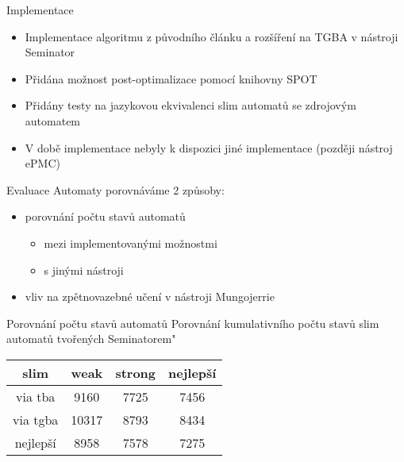 \documentclass[
]{beamer}
\begin{document}
	\begin{frame}{Implementace}
		\begin{itemize}
			\pause
			\item Implementace algoritmu z původního článku a rozšíření na TGBA v nástroji Seminator
			\pause
			\item Přidána možnost post-optimalizace pomocí knihovny SPOT
			\pause
				
			\pause
			\item Přidány testy na jazykovou ekvivalenci slim automatů se zdrojovým automatem
			\pause
			\item V době implementace nebyly k dispozici jiné implementace (později nástroj ePMC)
			
		\end{itemize}
	\end{frame}

	\begin{frame}{Evaluace}
		Automaty porovnáváme 2 způsoby:
		\pause
		\begin{itemize}
			\item porovnání počtu stavů automatů
			\begin{itemize}
				\item mezi implementovanými možnostmi
				\item s jinými nástroji
			\end{itemize}
			\pause
			\item vliv na zpětnovazebné učení v nástroji Mungojerrie
		\end{itemize}
	\end{frame}

	

	\begin{frame}{Porovnání počtu stavů automatů}
		Porovnání kumulativního počtu stavů slim automatů tvořených Seminatorem"
		\begin{table}[ht]
			\centering
			
			
			
	\begin{tabular}{ |c||c|c|c| } 		
		\hline
		
		slim&weak&\alert{strong}&nejlepší \\
		\hline
		\hline
		\alert{via tba}&9160& \alert{7725} & 7456\\
		\hline
		via tgba&10317& 8793& 8434\\ 
		\hline
		nejlepší&8958& 7578& \alert{7275} \\ 
		\hline
	\end{tabular}
\end{table}
\end{frame}
\end{document}
